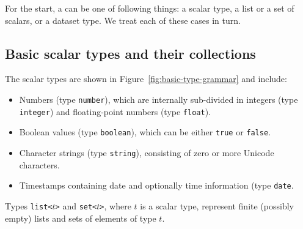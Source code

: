 \documentclass[droidmono,libertine,twoside,user,unofficial]{ecarticle}
\def\<#1>{\synt{#1}}
\begin{document}
For the start, a \<type-factor> can be one of following things: a
scalar type, a list or a set of scalars, or a dataset type.  We treat
each of these cases in turn.

\subsection{Basic scalar types and their collections}
\label{sec:basic-scalar-types}

The scalar types are shown in Figure~\ref{fig:basic-type-grammar} and
include:
\begin{itemize}
\item Numbers (type \texttt{number}), which are internally sub-divided
  in integers (type \texttt{integer}) and floating-point numbers (type
  \texttt{float}).

\item Boolean values (type \texttt{boolean}), which can be either
  \texttt{true} or \texttt{false}.\

\item Character strings (type \texttt{string}), consisting of zero or
  more Unicode characters.

\item Timestamps containing date and optionally time information (type
  \texttt{date}.
\end{itemize}

Types \texttt{list<$t$>} and \texttt{set<$t$>}, where $t$ is a scalar
type, represent finite (possibly empty) lists and sets of elements of
type $t$.


\end{document}
